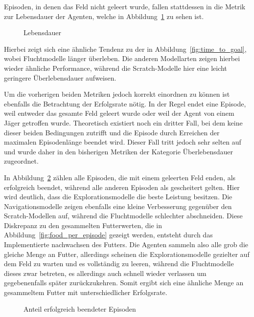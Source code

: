 Episoden, in denen das Feld nicht geleert wurde, fallen stattdessen in die Metrik zur Lebensdauer der Agenten, welche in Abbildung~\ref{fig:time_alive} zu sehen ist.
\begin{figure}[htbp]
  \centering
  \caption{Lebensdauer}
  \label{fig:time_alive}
\end{figure}
Hierbei zeigt sich eine ähnliche Tendenz zu der in Abbildung~\ref{fig:time_to_goal}, wobei Fluchtmodelle länger überleben. Die anderen Modellarten zeigen hierbei wieder ähnliche Performance, während die Scratch-Modelle hier eine leicht geringere Überlebensdauer aufweisen.

Um die vorherigen beiden Metriken jedoch korrekt einordnen zu können ist ebenfalls die Betrachtung der Erfolgsrate nötig. In der Regel endet eine Episode, weil entweder das gesamte Feld geleert wurde oder weil der Agent von einem Jäger getroffen wurde. Theoretisch existiert noch ein dritter Fall, bei dem keine dieser beiden Bedingungen zutrifft und die Episode durch Erreichen der maximalen Episodenlänge beendet wird. Dieser Fall tritt jedoch sehr selten auf und wurde daher in den bisherigen Metriken der Kategorie Überlebensdauer zugeordnet.

In Abbildung~\ref{fig:succesrate} zählen alle Episoden, die mit einem geleerten Feld enden, als erfolgreich beendet, während alle anderen Episoden als gescheitert gelten. Hier wird deutlich, dass die Explorationsmodelle die beste Leistung besitzen. Die Navigationsmodelle zeigen ebenfalls eine kleine Verbesserung gegenüber den Scratch-Modellen auf, während die Fluchtmodelle schlechter abschneiden. Diese Diskrepanz zu den gesammelten Futterwerten, die in Abbildung~\ref{fig:food_per_episode} gezeigt werden, entsteht durch das Implementierte nachwachsen des Futters. Die Agenten sammeln also alle grob die gleiche Menge an Futter, allerdings scheinen die Explorationsmodelle gezielter auf dem Feld zu warten und es vollständig zu leeren, während die Fluchtmodelle dieses zwar betreten, es allerdings auch schnell wieder verlassen um gegebenenfalls später zurückzukehren. Somit ergibt sich eine ähnliche Menge an gesammeltem Futter mit unterschiedlicher Erfolgsrate.

\begin{figure}[htbp]
  \centering
  \caption{Anteil erfolgreich beendeter Episoden}
  \label{fig:succesrate}
\end{figure}
